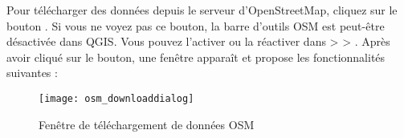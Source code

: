 Pour télécharger des données depuis le serveur d'OpenStreetMap, cliquez sur le bouton . Si vous ne voyez pas ce bouton, la barre d'outils OSM est peut-être désactivée dans QGIS. Vous pouvez l'activer ou la réactiver dans  >  > . Après avoir cliqué sur le bouton, une fenêtre apparaît et propose les fonctionnalités suivantes :

\begin{figure}[ht]
   \begin{center}
   \caption{Fenêtre de téléchargement de données OSM \nixcaption}\label{fig:osmdownload}\smallskip
   \texttt{[image: osm\_downloaddialog]}
\end{center}
\end{figure}

